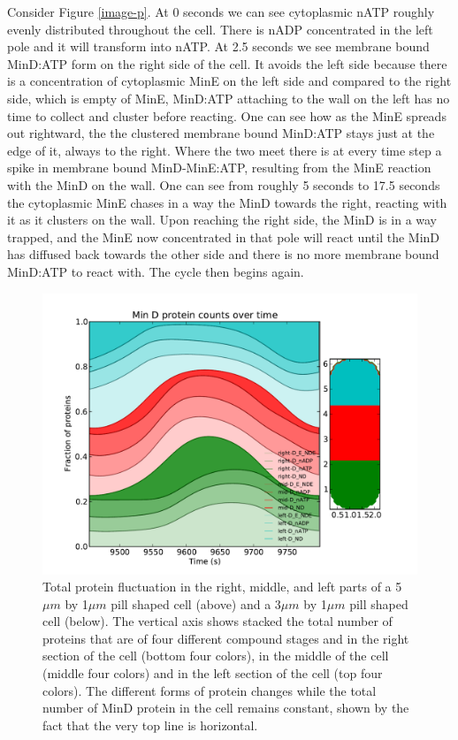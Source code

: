 \documentclass[letterpaper,twocolumn,amsmath,amssymb,pre]{revtex4-1}
\begin{document}
Consider Figure \ref{image-p}.  At 0 seconds we can see cytoplasmic
nATP roughly evenly distributed throughout the cell.  There is nADP
concentrated in the left pole and it will transform into nATP.  At 2.5
seconds we see membrane bound MinD:ATP form on the right side of the
cell.  It avoids the left side because there is a concentration of
cytoplasmic MinE on the left side and compared to the right side,
which is empty of MinE, MinD:ATP attaching to the wall on the left has
no time to collect and cluster before reacting.  One can see how as
the MinE spreads out rightward, the the clustered membrane bound
MinD:ATP stays just at the edge of it, always to the right.  Where the
two meet there is at every time step a spike in membrane bound
MinD-MinE:ATP, resulting from the MinE reaction with the MinD on the
wall.  One can see from roughly 5 seconds to 17.5 seconds the
cytoplasmic MinE chases in a way the MinD towards the right, reacting
with it as it clusters on the wall.  Upon reaching the right side, the
MinD is in a way trapped, and the MinE now concentrated in that pole
will react until the MinD has diffused back towards the other side and
there is no more membrane bound MinD:ATP to react with.  The cycle
then begins again.



\begin{figure}
  \includegraphics[width=\columnwidth]{../data/shape-p/plots/box-plot_D--p-200-50-0-0-1500}
  \caption{Total protein fluctuation in the right, middle, and left
    parts of a 5$\mu m$ by 1$\mu m$ pill shaped cell (above) and a
    3$\mu m$ by 1$\mu m$ pill shaped cell (below).  The vertical axis shows
    stacked the total number of proteins that are of four different
    compound stages and in the right section of the cell (bottom four
    colors), in the middle of the cell (middle four colors) and in the
    left section of the cell (top four colors). The different forms of
    protein changes while the total number of MinD protein in the cell
    remains constant, shown by the fact that the very top line is
    horizontal.}
  \label{box-p}
\end{figure}
\end{document}
